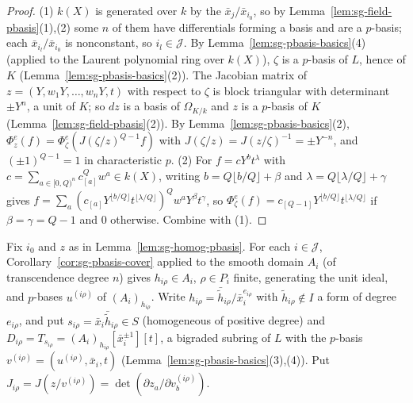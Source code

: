 \begin{proof}
(1) $k(X)$ is generated over $k$ by the $\bar x_j/\bar x_{i_0}$, so by Lemma~\ref{lem:sg-field-pbasis}(1),(2) some $n$ of them have differentials forming a
basis and are a $p$-basis; each $\bar x_{i_l}/\bar x_{i_0}$ is nonconstant, so $i_l\in\mathcal J$. By Lemma~\ref{lem:sg-pbasis-basics}(4) (applied to the
Laurent polynomial ring over $k(X)$), $\zeta$ is a $p$-basis of $L$, hence of $K$ (Lemma~\ref{lem:sg-pbasis-basics}(2)). The Jacobian matrix of
$z=(Y,w_1Y,\dots,w_nY,t)$ with respect to $\zeta$ is block triangular with determinant $\pm Y^n$, a unit of $K$; so $dz$ is a basis of $\Omega_{K/k}$
and $z$ is a $p$-basis of $K$ (Lemma~\ref{lem:sg-field-pbasis}(2)). By Lemma~\ref{lem:sg-pbasis-basics}(2),
$\Phi^e_z(f)=\Phi^e_\zeta(J(\zeta/z)^{Q-1}f)$ with $J(\zeta/z)=J(z/\zeta)^{-1}=\pm Y^{-n}$, and $(\pm1)^{Q-1}=1$ in characteristic $p$.
(2) For $f=cY^bt^\lambda$ with $c=\sum_{a\in[0,Q)^n}c_{[a]}^Qw^a\in k(X)$, writing $b=Q\lfloor b/Q\rfloor+\beta$ and $\lambda=Q\lfloor\lambda/Q\rfloor+\gamma$ gives
$f=\sum_a(c_{[a]}Y^{\lfloor b/Q\rfloor}t^{\lfloor\lambda/Q\rfloor})^Qw^aY^\beta t^\gamma$, so $\Phi^e_\zeta(f)=c_{[Q-1]}Y^{\lfloor b/Q\rfloor}t^{\lfloor\lambda/Q\rfloor}$ if
$\beta=\gamma=Q-1$ and $0$ otherwise. Combine with (1).
\end{proof}

\begin{definition}\label{def:sg-charts}
\leanok
{}
Fix $i_0$ and $z$ as in Lemma~\ref{lem:sg-homog-pbasis}. For each $i\in\mathcal J$, Corollary~\ref{cor:sg-pbasis-cover} applied to the smooth domain
$A_i$ (of transcendence degree $n$) gives $h_{i\rho}\in A_i$, $\rho\in P_i$ finite, generating the unit ideal, and $p$-bases $u^{(i\rho)}$ of
$(A_i)_{h_{i\rho}}$. Write $h_{i\rho}=\bar{\tilde h}_{i\rho}/\bar x_i^{e_{i\rho}}$ with $\tilde h_{i\rho}\notin I$ a form of degree $e_{i\rho}$, and put
$s_{i\rho}=\bar x_i\bar{\tilde h}_{i\rho}\in S$ (homogeneous of positive degree) and $D_{i\rho}=T_{s_{i\rho}}=(A_i)_{h_{i\rho}}[\bar x_i^{\pm1}][t]$, a
bigraded subring of $L$ with the $p$-basis $v^{(i\rho)}=(u^{(i\rho)},\bar x_i,t)$ (Lemma~\ref{lem:sg-pbasis-basics}(3),(4)). Put
$J_{i\rho}=J(z/v^{(i\rho)})=\det(\partial z_a/\partial v^{(i\rho)}_b)$.
\end{definition}


